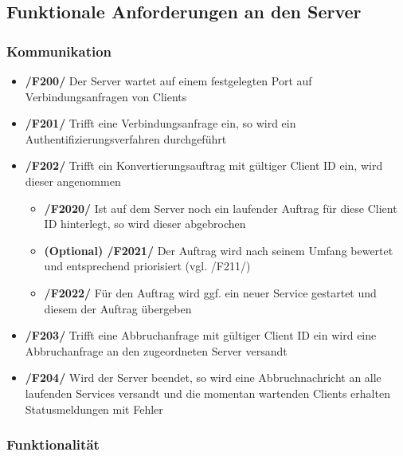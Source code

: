 \documentclass[11pt]{article} %
\begin{document}
\subsection{Funktionale Anforderungen an den Server}

\subsubsection{Kommunikation}

\begin{itemize}
\item{\textbf{/F200/} Der Server wartet auf einem festgelegten Port auf Verbindungsanfragen von Clients}
\item{\textbf{/F201/} Trifft eine Verbindungsanfrage ein, so wird ein Authentifizierungsverfahren durchgeführt}

\item{\textbf{/F202/} Trifft ein Konvertierungsauftrag mit gültiger Client ID ein, wird dieser angenommen}

\begin{itemize}
\item{\textbf{/F2020/} Ist auf dem Server noch ein laufender Auftrag für diese Client ID hinterlegt, so wird dieser abgebrochen}
\item{\textbf{(Optional) /F2021/} Der Auftrag wird nach seinem Umfang bewertet und entsprechend priorisiert (vgl. /F211/)}
\item{\textbf{/F2022/} Für den Auftrag wird ggf. ein neuer Service gestartet und diesem der Auftrag übergeben}
\end{itemize}

\item{\textbf{/F203/} Trifft eine Abbruchanfrage mit gültiger Client ID ein wird eine Abbruchanfrage an den zugeordneten Server versandt}
\item{\textbf{/F204/} Wird der Server beendet, so wird eine Abbruchnachricht an alle laufenden Services versandt und die momentan wartenden Clients erhalten Statusmeldungen mit Fehler}
\end{itemize}

\subsubsection{Funktionalität}
\end{document}
